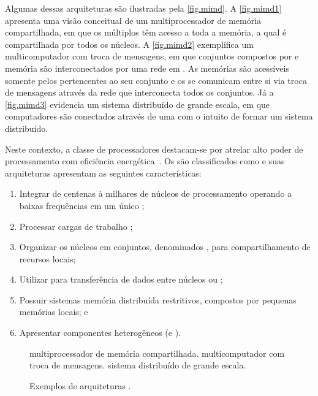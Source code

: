 Algumas dessas arquiteturas são ilustradas pela \autoref{fig.mimd}. A \autoref{fig.mimd1} apresenta uma visão conceitual de um multiprocessador de memória compartilhada, em que os múltiplos \cores têm acesso a toda a memória, a qual é compartilhada por todos os núcleos. A \autoref{fig.mimd2} exemplifica um multicomputador com troca de mensagens, em que conjuntos compostos por \cores e memória são interconectados por uma rede em \chip. As memórias são acessíveis somente pelos \cores pertencentes ao seu conjunto e os \cores se comunicam entre si via troca de mensagens através da rede que interconecta todos os conjuntos. Já a \autoref{fig.mimd3} evidencia um sistema distribuído de grande escala, em que computadores são conectados através de uma \wan com o intuito de formar um sistema distribuído.

Neste contexto, a classe de processadores \lws destacam-se por atrelar alto poder de processamento com eficiência energética~\cite{francesquini2015}. Os \lws são classificados como \mpsoc e suas arquiteturas apresentam as seguintes características:
\begin{enumerate}[label=(\roman*)]
    \item Integrar de centenas à milhares de núcleos de processamento operando a baixas frequências em um único \chip;
    \item Processar cargas de trabalho \mimd;
    \item Organizar os núcleos em conjuntos, denominados \clusters, para compartilhamento de recursos locais;
    \item Utilizar \nocs para transferência de dados entre núcleos ou \clusters;
    \item Possuir sistemas memória distribuída restritivos, compostos por pequenas memórias locais; e
    \item Apresentar componentes heterogêneos (\cclusters e \ioclusters).
\end{enumerate}

\begin{figure}[t]
	\centering
	
    \caption{Exemplos de arquiteturas \mimd.}%
                   {multiprocessador de memória compartilhada.}
                   {}
	\qquad
                   {multicomputador com troca de mensagens.}
                   {}
    \qquad
                   {sistema distribuído de grande escala.}
                   {}

    \label{fig.mimd}
\end{figure}

